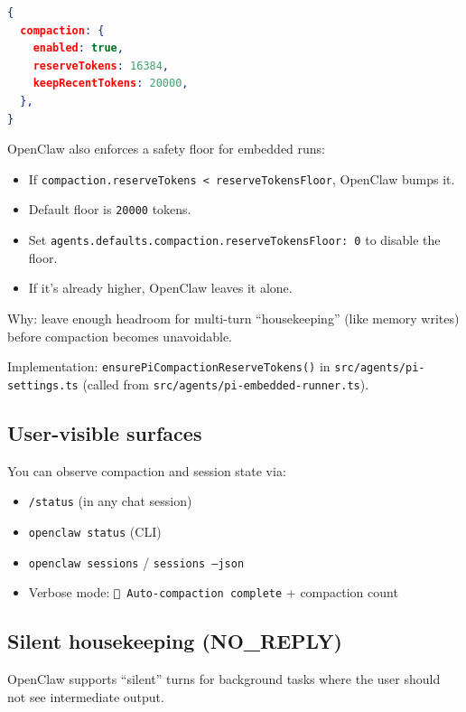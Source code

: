 \begin{lstlisting}[language=json]
{
  compaction: {
    enabled: true,
    reserveTokens: 16384,
    keepRecentTokens: 20000,
  },
}
\end{lstlisting}


OpenClaw also enforces a safety floor for embedded runs:

\begin{itemize}
  \item If \texttt{compaction.reserveTokens < reserveTokensFloor}, OpenClaw bumps it.
  \item Default floor is \texttt{20000} tokens.
  \item Set \texttt{agents.defaults.compaction.reserveTokensFloor: 0} to disable the floor.
  \item If it’s already higher, OpenClaw leaves it alone.
\end{itemize}


Why: leave enough headroom for multi-turn “housekeeping” (like memory writes) before compaction becomes unavoidable.

Implementation: \texttt{ensurePiCompactionReserveTokens()} in \texttt{src/agents/pi-settings.ts}
(called from \texttt{src/agents/pi-embedded-runner.ts}).

\hrulefill


\subsection{User-visible surfaces}


You can observe compaction and session state via:

\begin{itemize}
  \item \texttt{/status} (in any chat session)
  \item \texttt{openclaw status} (CLI)
  \item \texttt{openclaw sessions} / \texttt{sessions --json}
  \item Verbose mode: \texttt{🧹 Auto-compaction complete} + compaction count
\end{itemize}


\hrulefill


\subsection{Silent housekeeping (NO\_REPLY)}


OpenClaw supports “silent” turns for background tasks where the user should not see intermediate output.

